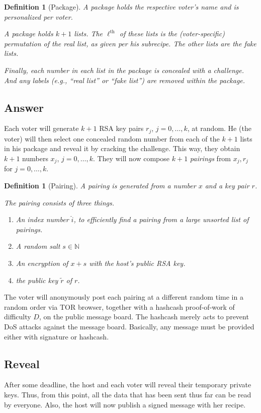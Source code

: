 \documentclass{article}
\newcommand{\N}{\mathbb{N}\xspace}
\newtheorem{defn}[thm]{Definition}
\theoremstyle{definition}
\begin{document}
	\begin{defn}[Package]
		A package holds the respective voter's name and is personalized per voter.
		
		A package holds $k+1$ lists. The $\ell^\text{th}$ of these lists is the (voter-specific) permutation of the real list, as given per his subrecipe. The other lists are the fake lists.
		
		Finally, each number in each list in the package is concealed with a challenge. And any labels (e.g., ``real list'' or ``fake list'') are removed within the package.
	\end{defn}
	
	\subsection{Answer}
	Each voter will generate $k+1$ RSA key pairs $r_j$, $j=0,\dots,k$, at random. He (the voter) will then select one concealed random number from each of the $k+1$ lists in his package and reveal it by cracking the challenge. This way, they obtain $k+1$ numbers $x_j$, $j=0,\dots,k$. They will now compose $k+1$ \emph{pairings} from $x_j,r_j$ for $j=0,\dots,k$.
	
	\begin{defn}[Pairing]
		A pairing is generated from a number $x$ and a key pair $r$.
		
		The pairing consists of three things.
		\begin{enumerate}
			\item An index number $\hat{i}$, to efficiently find a pairing from a large unsorted list of pairings.
			\item A random salt $s \in \N$
			\item An encryption of $x+s$ with the host's public RSA key.
			\item the public key $\tilde{r}$ of $r$.
		\end{enumerate}
	\end{defn}
	
	The voter will anonymously post each pairing at a different random time in a random order via TOR browser, together with a hashcash proof-of-work of difficulty $D$, on the public message board. The hashcash merely acts to prevent DoS attacks against the message board. Basically, any message must be provided either with signature or hashcash.
	
	\subsection{Reveal}
	After some deadline, the host and each voter will reveal their temporary private keys.
	Thus, from this point, all the data that has been sent thus far can be read by everyone.
	Also, the host will now publish a signed message with her recipe.
	
\end{document}

